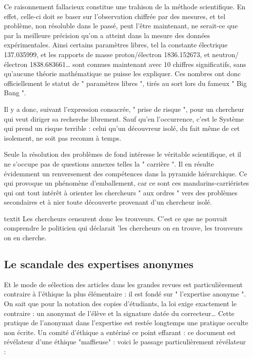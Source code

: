 \documentclass[a4paper,12pt]{article}
\begin{document}
Ce raisonnement fallacieux constitue une trahison de la méthode scientifique. En effet, celle-ci doit se baser sur l’observation chiffrée par des mesures, et tel problème, non résoluble dans le passé, peut l’être maintenant, ne serait-ce que par la meilleure précision qu’on a atteint dans la mesure des données expérimentales. Ainsi certains paramètres libres, tel la constante électrique 137.035999, et les rapports de masse proton/électron 1836.152673, et neutron/électron 1838.683661… sont connues maintenant avec 10 chiffres significatifs, sans qu’aucune théorie mathématique ne puisse les expliquer. Ces nombres ont donc officiellement le statut de " paramètres libres ", tirés au sort lors du fameux " Big Bang ".

Il y a donc, suivant l’expression consacrée, " prise de risque ", pour un chercheur qui veut diriger sa recherche librement. Sauf qu'en l’occurrence, c’est le Système qui prend un risque terrible : celui qu’un découvreur isolé, du fait même de cet isolement, ne soit pas reconnu à temps.

Seule la résolution des problèmes de fond intéresse le véritable scientifique, et il ne s’occupe pas de questions annexes telles la " carrière ". Il en résulte évidemment un renversement des compétences dans la pyramide hiérarchique. Ce qui provoque un phénomène d’emballement, car ce sont ces mandarins-carriéristes qui ont tout intérêt à orienter les chercheurs " aux ordres " vers des problèmes secondaires et à nier toute découverte provenant d’un chercheur isolé.

textit {Les chercheurs censurent donc les trouveurs}. C'est ce que ne pouvait comprendre le politicien qui déclarait 'les chercheurs on en trouve, les trouveurs on en cherche.


\subsection {Le scandale des expertises anonymes}

Et le mode de sélection des articles dans les grandes revues est particulièrement contraire à l’éthique la plus élémentaire : il est fondé sur " l’expertise anonyme ". On sait que pour la notation des copies d’étudiants, la loi exige exactement le contraire : un anonymat de l’élève et la signature datée du correcteur… Cette pratique de l’anonymat dans l’expertise est restée longtemps une pratique occulte non écrite. Un comité d’éthique a entériné ce point effarant : ce document est révélateur d’une éthique "maffieuse" : voici le passage particulièrement révélateur :
\end{document}
